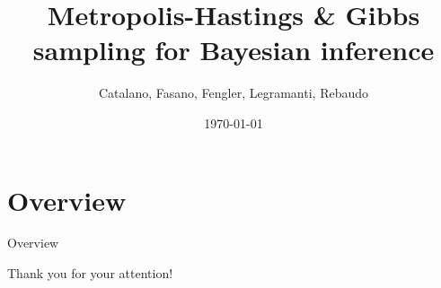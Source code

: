 \documentclass[xcolor=pdftex,dvipsnames,table]{UT}
\title{Metropolis-Hastings \& Gibbs sampling for Bayesian inference}
\subtitle{Catalano, Fasano, Fengler, Legramanti, Rebaudo}
\date{\today}
\begin{document}
 

\maketitleslide



{\small 
	
\section*{Overview}
\begin{frame}{Overview}
\tableofcontents
\end{frame}
	
 

 

\begin{frame}{}
\vspace{.5in}
\begin{center}
	Thank you for your attention!
\end{center}
\end{frame}

}
\end{document}

